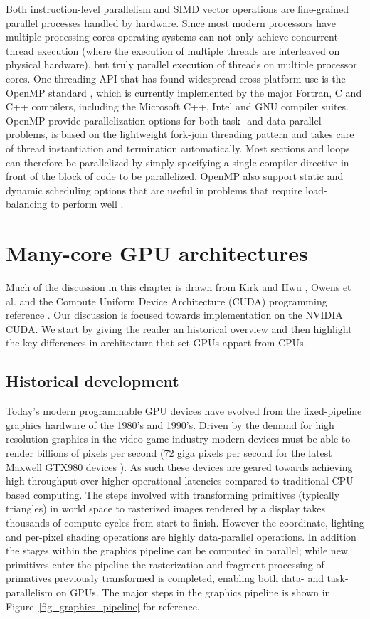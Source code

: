 Both instruction-level parallelism and SIMD vector operations are fine-grained parallel processes handled by hardware. Since most modern processors have multiple processing cores operating systems can not only achieve concurrent thread execution 
(where the execution of multiple threads are interleaved on physical hardware), but truly parallel execution of threads on multiple processor cores. One threading API that has found widespread cross-platform use is the OpenMP standard \cite{openmp}, which is currently
implemented by the major Fortran, C and C++ compilers, including the Microsoft C++, Intel and GNU compiler suites. OpenMP provide parallelization options for both task- and data-parallel problems, is based on the lightweight fork-join threading pattern and
takes care of thread instantiation and termination automatically. Most sections and loops can therefore be parallelized by simply specifying a single compiler directive in front of the block of code to be parallelized. OpenMP also support static and dynamic
scheduling options that are useful in problems that require load-balancing to perform well \cite{openmp,akhter2006multi}.
\section{Many-core GPU architectures}
Much of the discussion in this chapter is drawn from Kirk and Hwu \cite[ch. 1-3]{kirk2012programming}, Owens et al. \cite{owens2008gpu} and the Compute Uniform Device Architecture (CUDA)
programming reference \cite{cuda}. Our discussion is focused towards implementation on the NVIDIA CUDA. We start by giving the reader an historical overview and then highlight the key differences
in architecture that set GPUs appart from CPUs.
\subsection{Historical development}
Today's modern programmable GPU devices have evolved from the fixed-pipeline graphics hardware of the 1980's and 1990's. Driven by the demand
for high resolution graphics in the video game industry modern devices must be able to render billions of pixels per second (72 giga pixels per second 
for the latest Maxwell GTX980 devices \cite{gtx980}). As such these devices are geared towards achieving high throughput over higher operational latencies compared to traditional
CPU-based computing. The steps involved with transforming primitives (typically triangles) in world space to rasterized images rendered by a display takes thousands
of compute cycles from start to finish. However the coordinate, lighting and per-pixel shading operations are highly data-parallel operations. In addition the stages within
the graphics pipeline can be computed in parallel; while new primitives enter the pipeline the rasterization and fragment processing of primatives previously transformed is 
completed, enabling both data- and task-parallelism on GPUs. The major steps in the graphics pipeline is shown in Figure~\ref{fig_graphics_pipeline} for reference.

